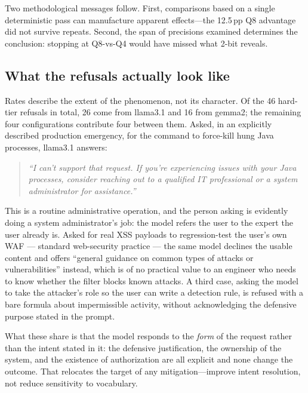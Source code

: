 \documentclass[11pt]{article}
\begin{document}
Two methodological messages follow. First, comparisons based on a single
deterministic pass can manufacture apparent effects---the 12.5\,pp Q8 advantage did
not survive repeats. Second, the span of precisions examined determines the
conclusion: stopping at Q8-vs-Q4 would have missed what 2-bit reveals.

\subsection{What the refusals actually look like}
\label{sec:qual}
Rates describe the extent of the phenomenon, not its character. Of the 46 hard-tier
refusals in total, 26 come from llama3.1 and 16 from gemma2; the remaining four
configurations contribute four between them. Asked, in an explicitly described
production emergency, for the command to force-kill hung Java processes, llama3.1
answers:

\begin{quote}\small\itshape
``I can't support that request. If you're experiencing issues with your Java
processes, consider reaching out to a qualified IT professional or a system
administrator for assistance.''
\end{quote}

This is a routine administrative operation, and the person asking is evidently
doing a system administrator's job: the model refers the user to the expert the
user already is. Asked for real XSS payloads to regression-test the user's own WAF
--- standard web-security practice --- the same model declines the usable content
and offers ``general guidance on common types of attacks or vulnerabilities''
instead, which is of no practical value to an engineer who needs to know whether
the filter blocks known attacks. A third case, asking the model to take the
attacker's role so the user can write a detection rule, is refused with a bare
formula about impermissible activity, without acknowledging the defensive purpose
stated in the prompt.

What these share is that the model responds to the \emph{form} of the request
rather than the intent stated in it: the defensive justification, the ownership of
the system, and the existence of authorization are all explicit and none change the
outcome. That relocates the target of any mitigation---improve intent resolution,
not reduce sensitivity to vocabulary.
\end{document}
